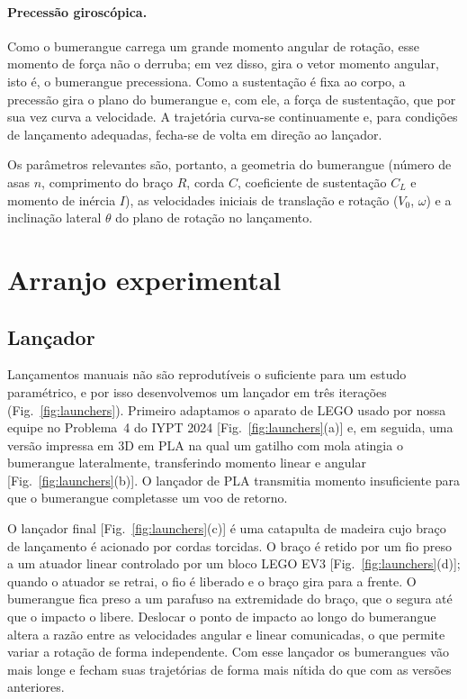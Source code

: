 \documentclass[aps,pre,twocolumn,superscriptaddress,nofootinbib,floatfix]{revtex4-2}
\begin{document}
\paragraph*{Precessão giroscópica.} Como o bumerangue carrega um grande momento angular de rotação, esse momento de força não o derruba; em vez disso, gira o vetor momento angular, isto é, o bumerangue precessiona. Como a sustentação é fixa ao corpo, a precessão gira o plano do bumerangue e, com ele, a força de sustentação, que por sua vez curva a velocidade. A trajetória curva-se continuamente e, para condições de lançamento adequadas, fecha-se de volta em direção ao lançador.

Os parâmetros relevantes são, portanto, a geometria do bumerangue (número de asas $n$, comprimento do braço $R$, corda $C$, coeficiente de sustentação $C_L$ e momento de inércia $I$), as velocidades iniciais de translação e rotação ($V_0$, $\omega$) e a inclinação lateral $\theta$ do plano de rotação no lançamento.

\section{Arranjo experimental}
\label{sec:setup}

\subsection{Lançador}

Lançamentos manuais não são reprodutíveis o suficiente para um estudo paramétrico, e por isso desenvolvemos um lançador em três iterações (Fig.~\ref{fig:launchers}). Primeiro adaptamos o aparato de LEGO usado por nossa equipe no Problema~4 do IYPT 2024 [Fig.~\ref{fig:launchers}(a)] e, em seguida, uma versão impressa em 3D em PLA na qual um gatilho com mola atingia o bumerangue lateralmente, transferindo momento linear e angular [Fig.~\ref{fig:launchers}(b)]. O lançador de PLA transmitia momento insuficiente para que o bumerangue completasse um voo de retorno.

O lançador final [Fig.~\ref{fig:launchers}(c)] é uma catapulta de madeira cujo braço de lançamento é acionado por cordas torcidas. O braço é retido por um fio preso a um atuador linear controlado por um bloco LEGO EV3 [Fig.~\ref{fig:launchers}(d)]; quando o atuador se retrai, o fio é liberado e o braço gira para a frente. O bumerangue fica preso a um parafuso na extremidade do braço, que o segura até que o impacto o libere. Deslocar o ponto de impacto ao longo do bumerangue altera a razão entre as velocidades angular e linear comunicadas, o que permite variar a rotação de forma independente. Com esse lançador os bumerangues vão mais longe e fecham suas trajetórias de forma mais nítida do que com as versões anteriores.
\end{document}
